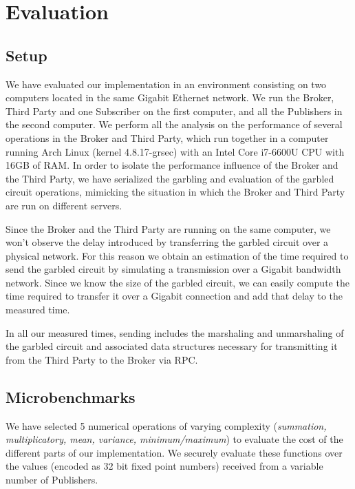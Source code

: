 \section{Evaluation}
\label{sec:evaluation}

\subsection{Setup}

We have evaluated our implementation in an environment consisting on two
computers located in the same Gigabit Ethernet network.  We run the Broker,
Third Party and one Subscriber on the first computer, and all the Publishers in
the second computer.  We perform all the analysis on the performance of several
operations in the Broker and Third Party, which run together in a computer
running Arch Linux (kernel 4.8.17-grsec) with an Intel Core i7-6600U CPU with
16GB of RAM.  In order to isolate the performance influence of the Broker and
the Third Party, we have serialized the garbling and evaluation of the garbled
circuit operations, mimicking the situation in which the Broker and Third Party
are run on different servers.

Since the Broker and the Third Party are running on the same computer, we won't
observe the delay introduced by transferring the garbled circuit over a
physical network.  For this reason we obtain an estimation of the time required
to send the garbled circuit by simulating a transmission over a Gigabit
bandwidth network.  Since we know the size of the garbled circuit, we can
easily compute the time required to transfer it over a Gigabit connection and
add that delay to the measured time.

In all our measured times, sending includes the marshaling and unmarshaling of
the garbled circuit and associated data structures necessary for transmitting
it from the Third Party to the Broker via RPC.

\subsection{Microbenchmarks}

We have selected 5 numerical operations of varying complexity (\emph{summation,
multiplicatory, mean, variance, minimum/maximum}) to evaluate the cost of the
different parts of our implementation.  We securely evaluate these functions
over the values (encoded as 32 bit fixed point numbers) received from a
variable number of Publishers.

